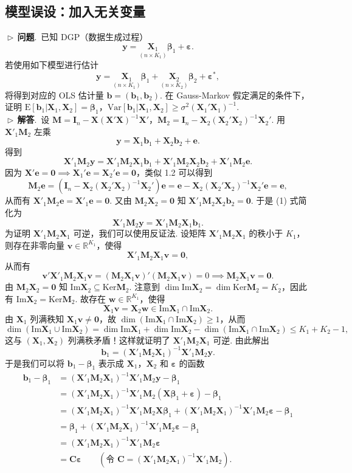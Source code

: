 \documentclass{article}
\newcommand{\E}{\mathrm{E}}
\newcommand{\Var}{\mathrm{Var}}
\newcommand{\y}{\mathbf{y}}
\newcommand{\X}{\mathbf{X}}
\newcommand{\M}{\mathbf{M}}
\newcommand{\e}{\mathbf{e}}
\newcommand{\0}{\mathbf{0}}
\newcommand{\vbe}{\bm{\beta}}
\newcommand{\vep}{\bm{\varepsilon}}
\newcommand{\vb}{\mathbf{b}}
\newcommand{\pro}{\noindent$\vartriangleright\,$\textbf{问题}.\ }
\newcommand{\sol}{\noindent$\vartriangleright\,$\textbf{解答}.\ }
\begin{document}
\subsection{模型误设：加入无关变量}
\pro 已知 DGP（数据生成过程）
\[
\y = \underset{(n\times K_1)}{\X_1}\vbe_1 +\vep.
\]
若使用如下模型进行估计
\[
\y = \underset{(n\times K_1)}{\X_1} \vbe_1 +\underset{(n\times K_2)}{\X_2} \vbe_2+\vep^*,
\]
将得到对应的 OLS 估计量 $\vb=(\vb_1,\vb_2)$. 在 Gauss-Markov 假定满足的条件下，证明 $\E[\vb_1|\X_1,\X_2]=\vbe_1$，$\Var[\vb_1|\X_1,\X_2]\ge\sigma^2(\X_1'\X_1)^{-1}$.\\

\sol 设 $\M=\mathbf{I}_n-\X(\X'\X)^{-1}\X'$，$\M_2=\mathbf{I}_n-\X_2(\X_2'\X_2)^{-1}\X_2'$. 用 $\X'_1\M_2$ 左乘
\[
\y = \X_1\vb_1 +\X_2 \vb_2+\e.
\]
得到
\begin{equation}
	\X'_1\M_2\y = \X'_1\M_2\X_1\vb_1 +\X'_1\M_2\X_2 \vb_2+\X'_1\M_2\e.
\end{equation}
因为 $\X'\e=\0\implies\X_1'\e=\X_2'\e=\0$，类似 1.2 可以得到
\[
\M_2\e=(\mathbf{I}_n-\X_2(\X_2'\X_2)^{-1}\X_2')\e=\e-\X_2(\X_2'\X_2)^{-1}\X_2'\e=\e,
\]
从而有 $\X'_1\M_2\e=\X'_1\e=\0$. 又由 $\M_2\X_2=\0$ 知 $\X'_1\M_2\X_2 \vb_2=\0$. 于是 (1) 式简化为
\[
\X'_1\M_2\y = \X'_1\M_2\X_1\vb_1 .
\]
为证明 $\X'_1\M_2\X_1$ 可逆，我们可以使用反证法. 设矩阵 $\X'_1\M_2\X_1$ 的秩小于 $K_1$，则存在非零向量 $\mathbf{v}\in\mathbb{R}^{K_1}$，使得
\[
\X'_1\M_2\X_1\mathbf{v}=\mathbf{0},
\]
从而有
\[
\mathbf{v}'\X'_1\M_2\X_1\mathbf{v}=(\M_2\X_1\mathbf{v})'(\M_2\X_1\mathbf{v})=0\implies \M_2\X_1\mathbf{v}=\mathbf{0}.
\]
由 $\M_2\X_2=\0$ 知 $\mathrm{Im}\X_2\subseteq\mathrm{Ker}\M_2$. 注意到 $\dim\mathrm{Im}\X_2=\dim\mathrm{Ker}\M_2=K_2$，因此有 $\mathrm{Im}\X_2=\mathrm{Ker}\M_2$. 故存在 $\mathbf{w}\in\mathbb{R}^{K_1}$，使得 \[
\X_1\mathbf{v}=\X_2\mathbf{w}\in\mathrm{Im}\X_1\cap\mathrm{Im}\X_2.
\]
由 $\X_{1}$ 列满秩知 $\X_1\mathbf{v}\ne\mathbf{0}$，故 $\dim(\mathrm{Im}\X_1\cap\mathrm{Im}\X_2)\ge1$，从而
\[
\dim(\mathrm{Im}\X_1\cup\mathrm{Im}\X_2)=\dim\mathrm{Im}\X_1+\dim\mathrm{Im}\X_2-\dim(\mathrm{Im}\X_1\cap\mathrm{Im}\X_2)\le K_1+K_2-1,
\]
这与 $(\X_1,\X_2)$ 列满秩矛盾！这样就证明了 $\X'_1\M_2\X_1$ 可逆. 由此解出
\[
\vb_1=(\X'_1\M_2\X_1)^{-1}\X'_1\M_2\y.
\]
于是我们可以将 $\vb_1-\vbe_1$ 表示成 $\X_1$，$\X_2$ 和 $\vep$ 的函数
\begin{align*}
\vb_1-\vbe_1&=(\X'_1\M_2\X_1)^{-1}\X'_1\M_2\y-\vbe_1\\
&=(\X'_1\M_2\X_1)^{-1}\X'_1\M_2(\X\vbe_1+\vep)-\vbe_1\\
&=(\X'_1\M_2\X_1)^{-1}\X'_1\M_2\X\vbe_1+(\X'_1\M_2\X_1)^{-1}\X'_1\M_2\vep-\vbe_1\\
&=\vbe_1+(\X'_1\M_2\X_1)^{-1}\X'_1\M_2\vep-\vbe_1\\
&=(\X'_1\M_2\X_1)^{-1}\X'_1\M_2\vep\\
&=\mathbf{C}\vep\qquad(\text{令 } \mathbf{C}=(\X'_1\M_2\X_1)^{-1}\X'_1\M_2).
\end{align*}
\end{document}
